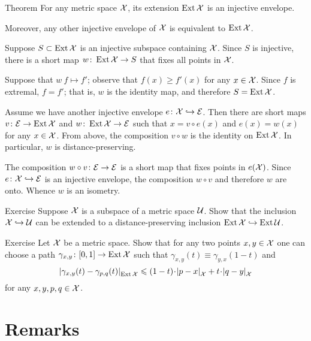 \begin{thm}{Theorem}\label{thm:inj-envelope}
For any metric space $\mathcal{X}$, its extension $\mathop{\rm Ext}\nolimits\mathcal{X}$ is an injective envelope.

Moreover, any other injective envelope of $\mathcal{X}$ is equivalent to $\mathop{\rm Ext}\nolimits\mathcal{X}$.
\end{thm}

Suppose $S\subset \mathop{\rm Ext}\nolimits\mathcal{X}$ is an injective subspace containing $\mathcal{X}$.
Since $S$ is injective, there is a short map $w\colon\mathop{\rm Ext}\nolimits\mathcal{X}\to S$ that fixes all points in $\mathcal{X}$.

Suppose that $w\:f\mapsto f'$; observe that $f(x)\ge f'(x)$ for any $x\in \mathcal{X}$.
Since $f$ is extremal, $f=f'$;
that is, $w$ is the identity map, and therefore $S=\mathop{\rm Ext}\nolimits\mathcal{X}$.

Assume we have another injective envelope $e\colon\mathcal{X}\hookrightarrow \mathcal{E}$.
Then there are short maps $v\colon\mathcal{E}\to \mathop{\rm Ext}\nolimits\mathcal{X}$ and $w\colon\mathop{\rm Ext}\nolimits\mathcal{X}\to \mathcal{E}$ such that $x=v\circ e(x)$ and $e(x)=w(x)$ for any $x\in\mathcal{X}$.
From above, the composition $v\circ w$ is the identity on $\mathop{\rm Ext}\nolimits\mathcal{X}$.
In particular, $w$ is distance-preserving.

The composition $w\circ v\colon\mathcal{E}\to \mathcal{E}$ is a short map that fixes points in $e(\mathcal{X})$.
Since $e\colon\mathcal{X}\hookrightarrow \mathcal{E}$ is an injective envelope, the composition $w\circ v$ and therefore $w$ are onto.
Whence $w$ is an isometry.
\qeds

\begin{thm}{Exercise}\label{ex:d-p-inclusion}
Suppose $\mathcal{X}$ is a subspace of a metric space $\mathcal{U}$.
Show that the inclusion $\mathcal{X}\hookrightarrow\mathcal{U}$ can be extended to a distance-preserving inclusion $\mathop{\rm Ext}\nolimits\mathcal{X}\hookrightarrow\mathop{\rm Ext}\nolimits\mathcal{U}$.
\end{thm}

\begin{thm}{Exercise}\label{ex:bicombing}
Let $\mathcal{X}$ be a metric space.
Show that for any two points $x,y\in \mathcal{X}$ one can choose a path $\gamma_{x,y}\colon[0,1]\to \mathop{\rm Ext}\nolimits\mathcal{X}$ such that
$\gamma_{x,y}(t)\equiv\gamma_{y,x}(1-t)$ and
\[\dist{\gamma_{x,y}(t)}{\gamma_{p,q}(t)}{\Inj\spc{X}}\le (1-t)\cdot\dist{p}{x}{\spc{X}}+t\cdot\dist{q}{y}{\spc{X}}\]
for any $x,y,p,q\in \mathcal{X}$.
\end{thm}



\section{Remarks}

